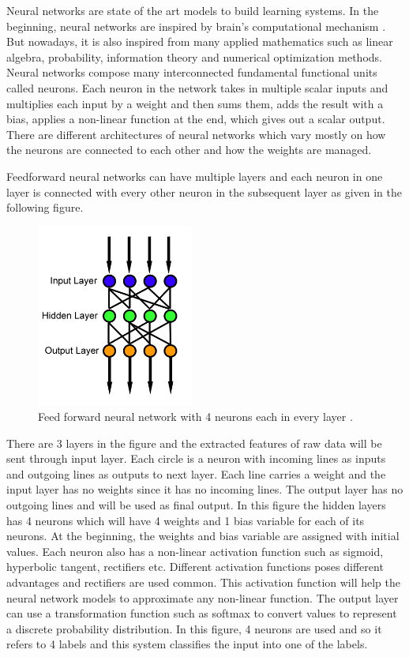 \documentclass[a4paper, 11pt]{article}
\begin{document}
Neural networks are state of the art models to build learning systems. In the beginning, neural networks are inspired by brain's computational mechanism \cite{McCulloch1943}. But nowadays, it is also inspired from many applied mathematics such as linear algebra, probability, information theory and numerical optimization methods\cite{Goodfellow2016}. Neural networks compose many interconnected fundamental functional units called neurons. Each neuron in the network takes in multiple scalar inputs and multiplies each input by a weight and then sums them, adds the result with a bias, applies a non-linear function at the end, which gives out a scalar output. There are different architectures of neural networks which vary mostly on how the neurons are connected to each other and how the weights are managed. 

Feedforward neural networks \cite{Svozil1997} can have multiple layers and each neuron in one layer is connected with every other neuron in the subsequent layer as given in the following figure. 

\begin{figure}[htpb]
    \centering
    \includegraphics[height=6cm,keepaspectratio=true]
    {Feed_forward_neural_net.png}
    \caption{
        Feed forward neural network with 4 neurons each in every layer \cite{WikipediaEN_FeedForward_Network}.
    }
    \label{fig:Feed forward neural network}
\end{figure}

There are 3 layers in the figure and the extracted features of raw data will be sent through input layer. Each circle is a neuron with incoming lines as inputs and outgoing lines as outputs to next layer. Each line carries a weight and the input layer has no weights since it has no incoming lines. The output layer has no outgoing lines and will be used as final output. In this figure the hidden layers has 4 neurons which will have 4 weights and 1 bias variable for each of its neurons. At the beginning, the weights and bias variable are assigned with initial values. Each neuron also has a non-linear activation function such as sigmoid, hyperbolic tangent, rectifiers etc. Different activation functions poses different advantages and rectifiers are used common. This activation function will help the neural network models to approximate any non-linear function. The output layer can use a transformation function such as softmax to convert values to represent a discrete probability distribution. In this figure, 4 neurons are used and so it refers to 4 labels and this system classifies the input into one of the labels.
\end{document}
